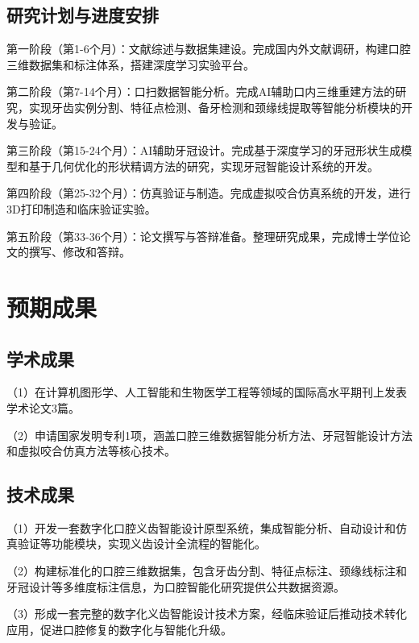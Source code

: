 \documentclass[12pt,hyperref,a4paper,UTF8]{ctexart}
\begin{document}
\subsection{研究计划与进度安排}

第一阶段（第1-6个月）：文献综述与数据集建设。完成国内外文献调研，构建口腔三维数据集和标注体系，搭建深度学习实验平台。

第二阶段（第7-14个月）：口扫数据智能分析。完成AI辅助口内三维重建方法的研究，实现牙齿实例分割、特征点检测、备牙检测和颈缘线提取等智能分析模块的开发与验证。

第三阶段（第15-24个月）：AI辅助牙冠设计。完成基于深度学习的牙冠形状生成模型和基于几何优化的形状精调方法的研究，实现牙冠智能设计系统的开发。

第四阶段（第25-32个月）：仿真验证与制造。完成虚拟咬合仿真系统的开发，进行3D打印制造和临床验证实验。

第五阶段（第33-36个月）：论文撰写与答辩准备。整理研究成果，完成博士学位论文的撰写、修改和答辩。

\section{预期成果}

\subsection{学术成果}

（1）在计算机图形学、人工智能和生物医学工程等领域的国际高水平期刊上发表学术论文3篇。

（2）申请国家发明专利1项，涵盖口腔三维数据智能分析方法、牙冠智能设计方法和虚拟咬合仿真方法等核心技术。

\subsection{技术成果}

（1）开发一套数字化口腔义齿智能设计原型系统，集成智能分析、自动设计和仿真验证等功能模块，实现义齿设计全流程的智能化。

（2）构建标准化的口腔三维数据集，包含牙齿分割、特征点标注、颈缘线标注和牙冠设计等多维度标注信息，为口腔智能化研究提供公共数据资源。

（3）形成一套完整的数字化义齿智能设计技术方案，经临床验证后推动技术转化应用，促进口腔修复的数字化与智能化升级。




\end{document}
